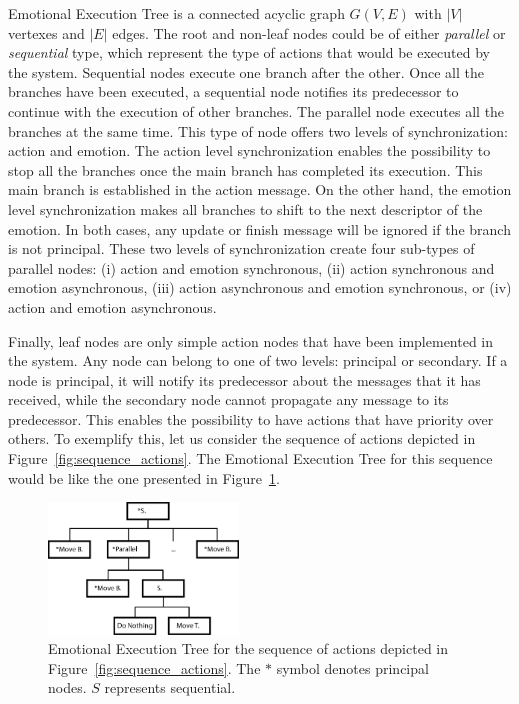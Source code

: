 Emotional Execution Tree is a connected acyclic graph $G(V,E)$ with $|V|$ vertexes and $|E|$ edges. The root and non-leaf nodes could be of either \textit{parallel} or \textit{sequential} type, which represent the type of actions that would be executed by the system. Sequential nodes execute one branch after the other. Once all the branches have been executed, a sequential node notifies its predecessor to continue with the execution of other branches. The parallel node executes all the branches at the same time. This type of node offers two levels of synchronization: action and emotion. The action level synchronization enables the possibility to stop all the branches once the main branch has completed its execution. This main branch is established in the action message. On the other hand, the emotion level synchronization makes all branches to shift to the next descriptor of the emotion. 
In both cases, any update or finish message will be ignored if the branch is not principal. These two levels of synchronization create four sub-types of parallel nodes: (i) action and emotion synchronous, (ii) action synchronous and emotion asynchronous, (iii) action asynchronous and emotion synchronous, or (iv) action and emotion asynchronous. 
 
Finally, leaf nodes are only simple action nodes that have been implemented in the system. Any node can belong to one of two levels: principal or secondary. If a node is principal, it will notify its predecessor about the messages that it has received, while the secondary node cannot propagate any message to its predecessor. This enables the possibility to have actions that have priority over others. To exemplify this, let us consider the sequence of actions depicted in Figure~\ref{fig:sequence_actions}. The Emotional Execution Tree for this sequence would be like the one presented in Figure~\ref{fig:emotional_enrichment}.

\begin{figure}
	\centering
	\includegraphics[width=0.45\textwidth]{./Images/Representation.png}
	\caption{Emotional Execution Tree for the sequence of actions depicted in Figure~\ref{fig:sequence_actions}. The $*$ symbol denotes principal nodes. $S$ represents sequential.}
	\label{fig:emotional_enrichment}
\end{figure}

